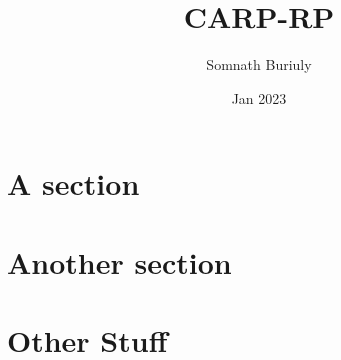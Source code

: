 \documentclass[a4paper]{article}
\title{CARP-RP}
\author{Somnath Buriuly}
\date{Jan 2023}
\begin{document}
\subbuildfalse 




\maketitle

\section{A section}
 
\section{Another section}
 
\section{Other Stuff}
 
 
%  
%  
%  
 

\printbibliography[title=List of all References]
\end{document}

